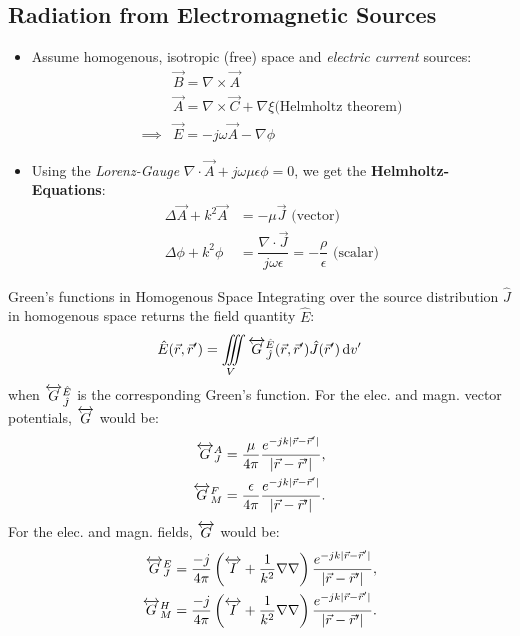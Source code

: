 \subsection{Radiation from Electromagnetic Sources}
\begin{itemize}
        \item Assume homogenous, isotropic (free) space and \textit{electric current} sources:
        \begin{align*}
          &\vec{B} = \nabla\times\vec{A}\\
          &\vec{A} = \nabla\times\vec{C} + \nabla\xi \text{(Helmholtz theorem)}\\
          \implies &\vec{E} = -j\omega\vec{A} -\nabla\phi
        \end{align*}
  \item Using the \textit{Lorenz-Gauge} $\nabla\cdot\vec{A} + j\omega\mu\epsilon\phi = 0$, we get the \textbf{Helmholtz-Equations}:
        \begin{align*}
          \Delta\vec{A} + k^{2}\vec{A} &= -\mu\vec{J}\text{ (vector)}\\
          \Delta\phi + k^{2}\phi &= \dfrac{\nabla\cdot\vec{J}}{j\omega\epsilon} = -\dfrac{\rho}{\epsilon}\text{ (scalar)}
        \end{align*}
\end{itemize}
\begin{info}{Green's functions in Homogenous Space}
  Integrating over the source distribution $\hat{J}$ in homogenous space returns the field quantity $\hat{E}$:
  \begin{equation*}
    \hat{E}(\vec{r},\vec{r}') = \iiint\limits_{V}\overleftrightarrow{G}_{\hat{J}}^{\hat{E}}(\vec{r},\vec{r}') \hat{J}(\vec{r}')\,\mathrm{d}v'
  \end{equation*}
  when $\overleftrightarrow{G}_{\hat{J}}^{\hat{E}}$ is the corresponding Green's function. For the elec. and magn. vector potentials, $\overleftrightarrow{G}$ would be:
  \begin{align*}
    \overleftrightarrow{G}_{J}^{A} = \dfrac{\mu}{4\pi} \dfrac{e^{-jk|\vec{r}-\vec{r}'|}}{|\vec{r}-\vec{r}'|},\\
    \overleftrightarrow{G}_{M}^{F} = \dfrac{\epsilon}{4\pi} \dfrac{e^{-jk|\vec{r}-\vec{r}'|}}{|\vec{r}-\vec{r}'|}.
  \end{align*}
  For the elec. and magn. fields, $\overleftrightarrow{G}$ would be:
  \begin{align*}
    \overleftrightarrow{G}_{J}^{E} = \dfrac{-j}{4\pi}\left(\overleftrightarrow{I} + \dfrac{1}{k^{2}}\nabla\nabla\right)\dfrac{e^{-jk|\vec{r}-\vec{r}'|}}{|\vec{r}-\vec{r}'|},\\
    \overleftrightarrow{G}_{M}^{H} = \dfrac{-j}{4\pi}\left(\overleftrightarrow{I} + \dfrac{1}{k^{2}}\nabla\nabla\right)\dfrac{e^{-jk|\vec{r}-\vec{r}'|}}{|\vec{r}-\vec{r}'|}.
  \end{align*}
\end{info}


